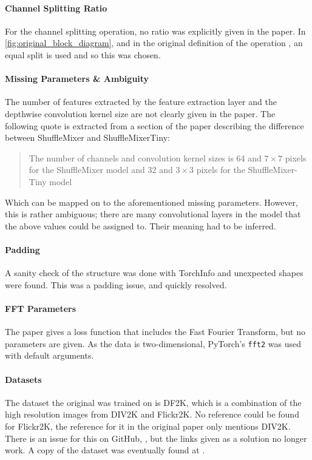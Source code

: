 \documentclass{article}
\begin{document}
    \paragraph{Channel Splitting Ratio} For the channel splitting operation, no ratio was explicitly given in the paper. In \cref{fig:original_block_diagram}, and in the original definition of the operation \citep{ma2018shufflenet}, an equal split is used and so this was chosen.

    \paragraph{Missing Parameters \& Ambiguity} The number of features extracted by the feature extraction layer and the depthwise convolution kernel size are not clearly given in the paper. The following quote is extracted from a section of the paper describing the difference between ShuffleMixer and ShuffleMixerTiny:

    \begin{quotation}
    The number of channels and convolution kernel sizes is 64 and
    $7 \times 7$ pixels for the ShuffleMixer model and 32 and $3 \times 3$ pixels for the ShuffleMixer-Tiny model
    \end{quotation}

    Which can be mapped on to the aforementioned missing parameters. However, this is rather ambiguous; there are many convolutional layers in the model that the above values could be assigned to. Their meaning had to be inferred.

    \paragraph{Padding} A sanity check of the structure was done with TorchInfo and unexpected shapes were found. This was a padding issue, and quickly resolved.

    \paragraph{FFT Parameters} The paper gives a loss function that includes the Fast Fourier Transform, but no parameters are given. As the data is two-dimensional, PyTorch's {\tt fft2} was used with default arguments.

    \paragraph{Datasets} The dataset the original was trained on is DF2K, which is a combination of the high resolution images from DIV2K \citep{Agustsson_2017_CVPR_Workshops} and Flickr2K. No reference could be found for Flickr2K, the reference for it in the original paper \citep{DBLP:journals/corr/LimSKNL17} only mentions DIV2K. There is an issue for this on GitHub, \citet{LimbeeGithub}, but the links given as a solution no longer work. A copy of the dataset was eventually found at \citet{Ddlee_2019Dataset}.
\end{document}
